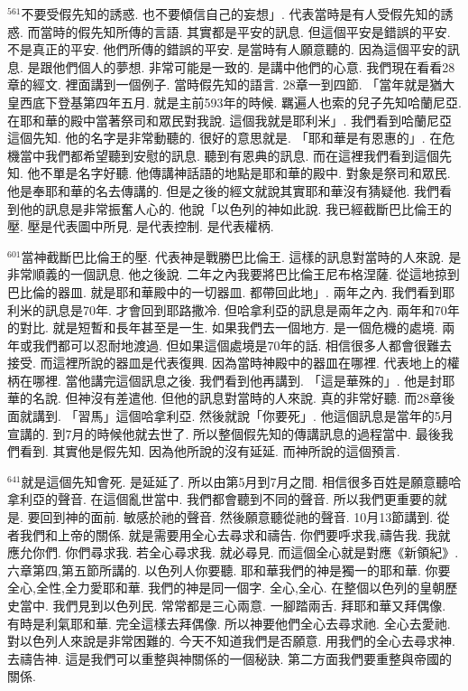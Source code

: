 \documentclass{book}
\begin{document}
$^{561}$不要受假先知的誘惑.
也不要傾信自己的妄想」.
代表當時是有人受假先知的誘惑.
而當時的假先知所傳的言語.
其實都是平安的訊息.
但這個平安是錯誤的平安.
不是真正的平安.
他們所傳的錯誤的平安.
是當時有人願意聽的.
因為這個平安的訊息.
是跟他們個人的夢想.
非常可能是一致的.
是講中他們的心意.
我們現在看看28章的經文.
裡面講到一個例子.
當時假先知的語言.
28章一到四節.
「當年就是猶大皇西底下登基第四年五月.
就是主前593年的時候.
羈遍人也索的兒子先知哈蘭尼亞.
在耶和華的殿中當著祭司和眾民對我說.
這個我就是耶利米」.
我們看到哈蘭尼亞這個先知.
他的名字是非常動聽的.
很好的意思就是.
「耶和華是有恩惠的」.
在危機當中我們都希望聽到安慰的訊息.
聽到有恩典的訊息.
而在這裡我們看到這個先知.
他不單是名字好聽.
他傳講神話語的地點是耶和華的殿中.
對象是祭司和眾民.
他是奉耶和華的名去傳講的.
但是之後的經文就說其實耶和華沒有猜疑他.
我們看到他的訊息是非常振奮人心的.
他說「以色列的神如此說.
我已經截斷巴比倫王的壓.
壓是代表圖中所見.
是代表控制.
是代表權柄.

$^{601}$當神截斷巴比倫王的壓.
代表神是戰勝巴比倫王.
這樣的訊息對當時的人來說.
是非常順義的一個訊息.
他之後說.
二年之內我要將巴比倫王尼布格涅薩.
從這地掠到巴比倫的器皿.
就是耶和華殿中的一切器皿.
都帶回此地」.
兩年之內.
我們看到耶利米的訊息是70年.
才會回到耶路撒冷.
但哈拿利亞的訊息是兩年之內.
兩年和70年的對比.
就是短暫和長年甚至是一生.
如果我們去一個地方.
是一個危機的處境.
兩年或我們都可以忍耐地渡過.
但如果這個處境是70年的話.
相信很多人都會很難去接受.
而這裡所說的器皿是代表復興.
因為當時神殿中的器皿在哪裡.
代表地上的權柄在哪裡.
當他講完這個訊息之後.
我們看到他再講到.
「這是華殊的」.
他是封耶華的名說.
但神沒有差遣他.
但他的訊息對當時的人來說.
真的非常好聽.
而28章後面就講到.
「習馬」這個哈拿利亞.
然後就說「你要死」.
他這個訊息是當年的5月宣講的.
到7月的時候他就去世了.
所以整個假先知的傳講訊息的過程當中.
最後我們看到.
其實他是假先知.
因為他所說的沒有延延.
而神所說的這個預言.

$^{641}$就是這個先知會死.
是延延了.
所以由第5月到7月之間.
相信很多百姓是願意聽哈拿利亞的聲音.
在這個亂世當中.
我們都會聽到不同的聲音.
所以我們更重要的就是.
要回到神的面前.
敏感於祂的聲音.
然後願意聽從祂的聲音.
10月13節講到.
從者我們和上帝的關係.
就是需要用全心去尋求和禱告.
你們要呼求我,禱告我.
我就應允你們.
你們尋求我.
若全心尋求我.
就必尋見.
而這個全心就是對應《新領紀》.
六章第四,第五節所講的.
以色列人你要聽.
耶和華我們的神是獨一的耶和華.
你要全心,全性,全力愛耶和華.
我們的神是同一個字.
全心,全心.
在整個以色列的皇朝歷史當中.
我們見到以色列民.
常常都是三心兩意.
一腳踏兩舌.
拜耶和華又拜偶像.
有時是利氣耶和華.
完全這樣去拜偶像.
所以神要他們全心去尋求祂.
全心去愛祂.
對以色列人來說是非常困難的.
今天不知道我們是否願意.
用我們的全心去尋求神.
去禱告神.
這是我們可以重整與神關係的一個秘訣.
第二方面我們要重整與帝國的關係.
\end{document}
